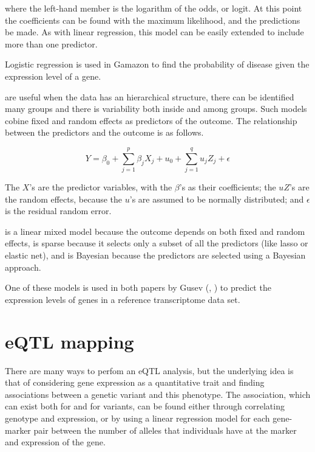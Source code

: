 \documentclass[../main.tex]{subfiles}
\begin{document}
where the left-hand member is the logarithm of the odds, or logit. At 
this point the coefficients can be found with the maximum likelihood, 
and the predictions be made. As with linear regression, this model can 
be easily extended to include more than one predictor.

Logistic regression is used in Gamazon \etal to find the probability of 
disease given the expression level of a gene.

 are useful when the data has an 
hierarchical structure, \ie there can be identified many groups and 
there is variability both inside and among groups. Such models cobine 
fixed and random effects as predictors of the outcome. The relationship 
between the predictors and the outcome is as follows.

\begin{equation}
	Y = \beta_0 + \sum_{j=1}^{p} \beta_j X_j +
		u_0 + \sum_{j=1}^{q} u_j Z_j + \epsilon
\end{equation}

The $X$'s are the predictor variables, with the $\beta$'s as their 
coefficients; the $uZ$'s are the random effects, because the $u$'s are 
assumed to be normally distributed; and $\epsilon$ is the residual 
random error.

 is a 
linear mixed model because the outcome depends on both fixed and random 
effects, is sparse because it selects only a subset of all the 
predictors (like lasso or elastic net), and is Bayesian because the 
predictors are selected using a Bayesian approach.

One of these models is used in both papers by Gusev \etal 
(, ) to predict the expression levels 
of genes in a reference transcriptome data set.

\section{eQTL mapping}

There are many ways to perfom an eQTL analysis\cite{Gilad2008}, but the 
underlying idea is that of considering gene expression as a quantitative 
trait and finding associations between a genetic variant and this 
phenotype. The association, which can exist both for \cis and for \trans 
variants, can be found either through correlating genotype and 
expression, or by using a linear regression model for each gene-marker 
pair between the number of alleles that individuals have at the marker 
and expression of the gene.
\end{document}
